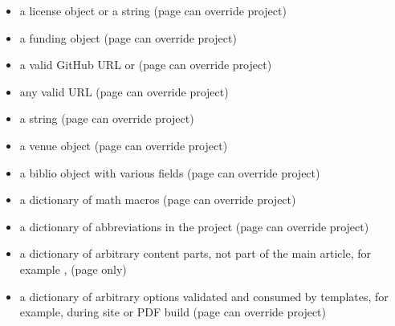 \documentclass[letterpaper,12pt,english]{sphinxmanual}
\begin{document}
\begin{itemize}
\item {} 
\sphinxAtStartPar
{} \sphinxhyphen{} a license object or a string (page can override project)

\item {} 
\sphinxAtStartPar
{} \sphinxhyphen{} a funding object (page can override project)

\item {} 
\sphinxAtStartPar
{} \sphinxhyphen{} a valid GitHub URL or  (page can override project)

\item {} 
\sphinxAtStartPar
{} any valid URL (page can override project)

\item {} 
\sphinxAtStartPar
{} \sphinxhyphen{} a string (page can override project)

\item {} 
\sphinxAtStartPar
{} \sphinxhyphen{} a venue object (page can override project)

\item {} 
\sphinxAtStartPar
{} \sphinxhyphen{} a biblio object with various fields (page can override project)

\item {} 
\sphinxAtStartPar
{} \sphinxhyphen{} a dictionary of math macros (page can override project)

\item {} 
\sphinxAtStartPar
{} \sphinxhyphen{} a dictionary of abbreviations in the project (page can override project)

\item {} 
\sphinxAtStartPar
{} \sphinxhyphen{} a dictionary of arbitrary content parts, not part of the main article, for example ,  (page only)

\item {} 
\sphinxAtStartPar
{} \sphinxhyphen{} a dictionary of arbitrary options validated and consumed by templates, for example, during site or PDF build (page can override project)

\end{itemize}
\end{document}

